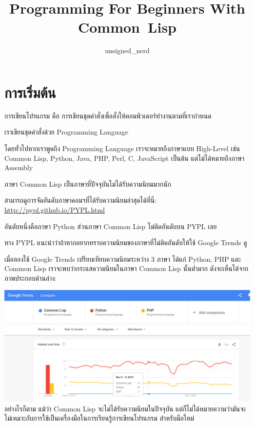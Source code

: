 \documentclass[a4paper]{article}
\begin{document}
\title{Programming For Beginners With Common~Lisp}
\author{unsigned\_nerd}
\maketitle

\tableofcontents

\section{การเริ่มต้น}

การเขียนโปรแกรม คือ การเขียนชุดคำสั่งเพื่อสั่งให้คอมพิวเตอร์ทำงานตามที่เรากำหนด

เราเขียนชุดคำสั่งด้วย Programming Language

โดยทั่วไปหากเราพูดถึง Programming Language เราจะหมายถึงภาษาแบบ High-Level เช่น
Common Lisp, Python, Java, PHP, Perl, C, JavaScript เป็นต้น
แต่ไม่ได้หมายถึงภาษา Assembly

ภาษา Common Lisp เป็นภาษาที่ปัจจุบันไม่ได้รับความนิยมมากนัก

สามารถดูการจัดอันดับภาษาคอมฯที่ได้รับความนิยมล่าสุดได้ที่นี่: \href{http://pypl.github.io/PYPL.html}{http://pypl.github.io/PYPL.html}

อันดับหนึ่งคือภาษา Python ส่วนภาษา Common Lisp ไม่ติดอันดับบน PYPL เลย

ทาง PYPL แนะนำว่าถ้าหากอยากทราบความนิยมของภาษาที่ไม่ติดอันดับให้ใช้ Google Trends ดู

เมื่อลองใช้ Google Trends เปรียบเทียบความนิยมระหว่าง 3 ภาษา ได้แก่ Python, PHP
และ Common Lisp เราจะพบว่ากระแสความนิยมในภาษา Common Lisp นั้นต่ำมาก
ดังจะเห็นได้จากภาพประกอบด้านล่าง:

\includegraphics[width=\linewidth]{images/lang-popularity.png} \\

อย่างไรก็ตาม แม้ว่า Common Lisp จะไม่ได้รับความนิยมในปัจจุบัน
แต่ก็ไม่ได้หมายความว่ามันจะไม่เหมาะกับการใช้เป็นเครื่องมือในการเรียนรู้การเขียนโปรแกรม%
สำหรับมือใหม่
\end{document}
